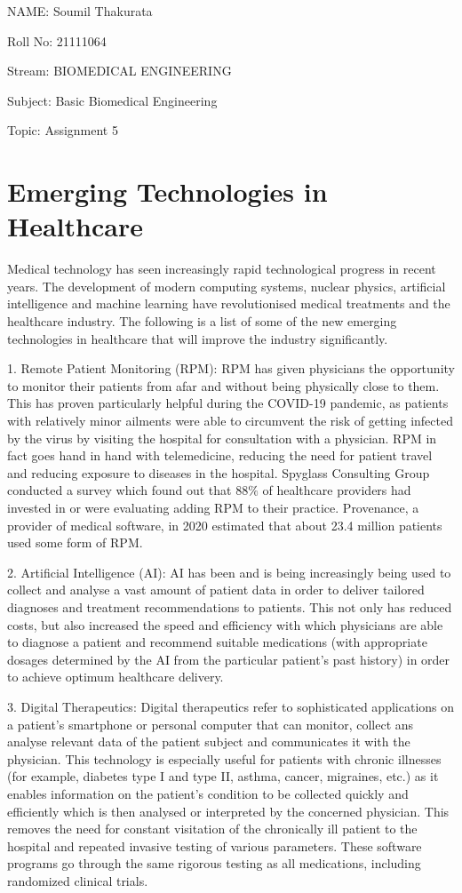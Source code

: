 \documentclass[11pt]{article}
\begin{document}
NAME: Soumil Thakurata

Roll No: 21111064

Stream: BIOMEDICAL ENGINEERING

Subject: Basic Biomedical Engineering

Topic: Assignment 5

\pagebreak


\section*{\centering Emerging Technologies in Healthcare}

Medical technology has seen increasingly rapid technological progress in recent years. The development of modern computing systems, nuclear physics, artificial intelligence and machine learning have revolutionised medical treatments and the healthcare industry. The following is a list of some of the new emerging technologies in healthcare that will improve the industry significantly.

1. Remote Patient Monitoring (RPM): RPM has given physicians the opportunity to monitor their patients from afar and without being physically close to them. This has proven particularly helpful during the COVID-19 pandemic, as patients with relatively minor ailments were able to circumvent the risk of getting infected by the virus by visiting the hospital for consultation with a physician. RPM in fact goes hand in hand with telemedicine, reducing the need for patient travel and reducing exposure to diseases in the hospital. Spyglass Consulting Group conducted a survey which found out that 88$\%$ of healthcare providers had invested in or were evaluating adding RPM to their practice. Provenance, a provider of medical software, in 2020 estimated that about 23.4 million patients used some form of RPM.

2. Artificial Intelligence (AI): AI has been and is being increasingly being used to collect and analyse a vast amount of patient data in order to deliver tailored diagnoses and treatment recommendations to patients. This not only has reduced costs, but also increased the speed and efficiency with which physicians are able to diagnose a patient and recommend suitable medications (with appropriate dosages determined by the AI from the particular patient's past history) in order to achieve optimum healthcare delivery.

3. Digital Therapeutics: Digital therapeutics refer to sophisticated applications on a patient's smartphone or personal computer that can monitor, collect ans analyse relevant data of the patient subject and communicates it with the physician. This technology is especially useful for patients with chronic illnesses (for example, diabetes type I and type II, asthma, cancer, migraines, etc.) as it enables information on the patient's condition to be collected quickly and efficiently which is then analysed or interpreted by the concerned physician. This removes the need for constant visitation of the chronically ill patient to the hospital and repeated invasive testing of various parameters. These software programs go through the same rigorous testing as all medications, including randomized clinical trials.
\end{document}
